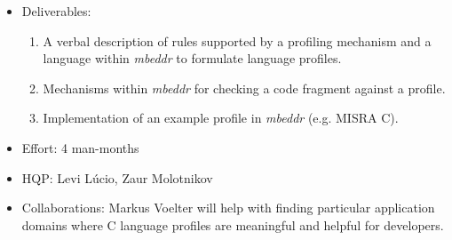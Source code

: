 \begin{itemize}
  \item Deliverables:
  \begin{enumerate}
    \item A verbal description of rules supported by a profiling mechanism and a
    language within \emph{mbeddr} to formulate language profiles.
    \item Mechanisms within \emph{mbeddr} for checking a code fragment against a
    profile.
    \item Implementation of an example profile in \emph{mbeddr} (e.g. MISRA
    C).
  \end{enumerate}
  \item Effort: 4 man-months
  \item HQP: Levi L\'ucio, Zaur Molotnikov
  \item Collaborations: Markus Voelter will help with finding
  particular application domains where C language profiles are meaningful and
  helpful for developers.
\end{itemize}

